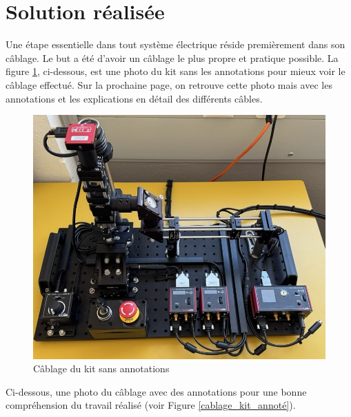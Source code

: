 \section{Solution réalisée}
Une étape essentielle dans tout système électrique réside premièrement dans son câblage. Le but a été d'avoir un câblage le plus propre et pratique possible.
La figure \ref{cablage_kit_pas_annoté}, ci-dessous, est une photo du kit sans les annotations pour mieux voir le câblage effectué. Sur la prochaine page, on retrouve cette photo mais avec les annotations et les explications en détail des différents câbles.
\begin{figure}[H]
    \begin{center}
        \includegraphics[width=\textwidth]{assets/figures/Cablage_du_kit/Cablage_vierge.jpeg}
    \end{center}
    \caption{Câblage du kit sans annotations}
    \label{cablage_kit_pas_annoté}
\end{figure}

\newpage
Ci-dessous, une photo du câblage avec des annotations pour une bonne compréhension du travail réalisé (voir Figure \ref{cablage_kit_annoté}).


